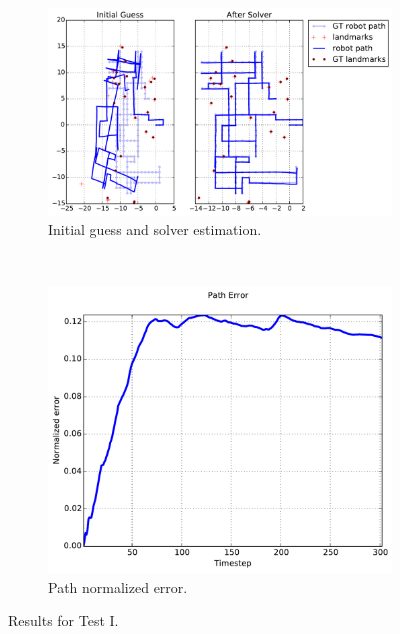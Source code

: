 \begin{figure}[htbp!]
\centering
\begin{subfigure}[b]{\estWidth\textwidth}
\includegraphics[width=\textwidth]{imagenes/tests/known/res_it_20_nl_40_op_1000_oa_1000_lp_1000_ds_300_kw_1.pdf}
\caption{Initial guess and solver estimation.}
\label{fig:test-ia}
\end{subfigure}\\
\begin{subfigure}[b]{\errorWidth\textwidth}
\includegraphics[width=\textwidth]{imagenes/tests/known/res_it_20_nl_40_op_1000_oa_1000_lp_1000_ds_300_kw_1_path.pdf}
\caption{Path normalized error.}
\label{fig:test-ib}
\end{subfigure}
\caption{Results for Test I.}
\label{fig:test-i}
\end{figure}
\clearpage

